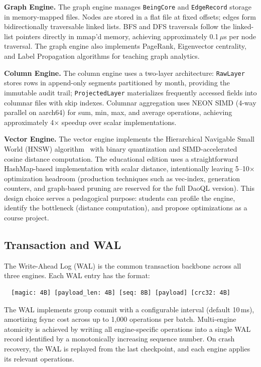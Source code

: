 \documentclass[11pt,a4paper]{article}
\begin{document}
\textbf{Graph Engine.} The graph engine manages \texttt{BeingCore} and
\texttt{EdgeRecord} storage in memory-mapped files. Nodes are stored in a
flat file at fixed offsets; edges form bidirectionally traversable linked
lists. BFS and DFS traversals follow the linked-list pointers directly in
mmap'd memory, achieving approximately 0.1\,$\mu$s per node traversal. The
graph engine also implements PageRank, Eigenvector centrality, and Label
Propagation algorithms for teaching graph analytics.

\textbf{Column Engine.} The column engine uses a two-layer architecture:
\texttt{RawLayer} stores rows in append-only segments partitioned by month,
providing the immutable audit trail; \texttt{ProjectedLayer} materializes
frequently accessed fields into columnar files with skip indexes. Columnar
aggregation uses NEON SIMD (4-way parallel on aarch64) for sum, min, max,
and average operations, achieving approximately 4$\times$ speedup over
scalar implementations.

\textbf{Vector Engine.} The vector engine implements the Hierarchical
Navigable Small World (HNSW) algorithm~\cite{malkov2018} with binary
quantization and SIMD-accelerated cosine distance computation. The
educational edition uses a straightforward HashMap-based implementation with
scalar distance, intentionally leaving 5--10$\times$ optimization headroom
(production techniques such as vec-index, generation counters, and
graph-based pruning are reserved for the full DaoQL version). This design
choice serves a pedagogical purpose: students can profile the engine,
identify the bottleneck (distance computation), and propose optimizations as
a course project.

\subsection{Transaction and WAL}

The Write-Ahead Log (WAL) is the common transaction backbone across all
three engines. Each WAL entry has the format:

\begin{verbatim}
  [magic: 4B] [payload_len: 4B] [seq: 8B] [payload] [crc32: 4B]
\end{verbatim}

The WAL implements group commit with a configurable interval (default
10\,ms), amortizing fsync cost across up to 1,000 operations per batch.
Multi-engine atomicity is achieved by writing all engine-specific operations
into a single WAL record identified by a monotonically increasing sequence
number. On crash recovery, the WAL is replayed from the last checkpoint,
and each engine applies its relevant operations.
\end{document}

